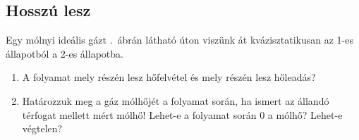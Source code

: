 \documentclass[12pt,a4paper]{scrartcl}
\begin{document}
\subsection{Hosszú lesz}
Egy mólnyi ideális gázt .\ ábrán látható úton viszünk át kvázisztatikusan az 1-es állapotból a 2-es állapotba.
\begin{enumerate}
\item A folyamat mely részén lesz hőfelvétel és mely részén lesz hőleadás?
\item Határozzuk meg a gáz mólhőjét a folyamat során, ha ismert az állandó térfogat mellett mért mólhő! Lehet-e a folyamat során 0 a mólhő? Lehet-e végtelen?
\end{enumerate}
\end{document}

